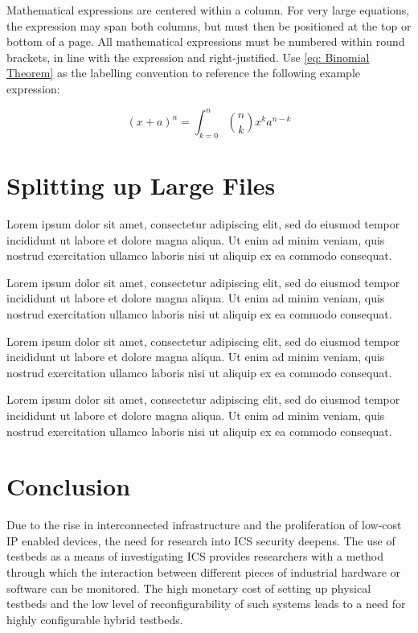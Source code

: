 \documentclass[10pt,conference,a4paper,onecolumn] {IEEEtran}
\begin{document}
\begin{multicols}{2}
Mathematical expressions are centered within a column. For very large equations, the expression may span both columns, but must then be positioned at the top or bottom of a page. All mathematical expressions must be numbered within round brackets, in line with the expression and right-justified. Use \eqref{eq: Binomial Theorem} as the labelling convention to reference the following example expression:

\begin{equation}\label{eq: Binomial Theorem}
(x+a)^n=\int_{k=0}^n\binom{n}{k}x^k a^{n-k}
\end{equation}

\section{Splitting up Large Files}

Lorem ipsum dolor sit amet, consectetur adipiscing elit, sed do eiusmod tempor incididunt ut labore et dolore magna aliqua. Ut enim ad minim veniam, quis nostrud exercitation ullamco laboris nisi ut aliquip ex ea commodo consequat. 

Lorem ipsum dolor sit amet, consectetur adipiscing elit, sed do eiusmod tempor incididunt ut labore et dolore magna aliqua. Ut enim ad minim veniam, quis nostrud exercitation ullamco laboris nisi ut aliquip ex ea commodo consequat.

Lorem ipsum dolor sit amet, consectetur adipiscing elit, sed do eiusmod tempor incididunt ut labore et dolore magna aliqua. Ut enim ad minim veniam, quis nostrud exercitation ullamco laboris nisi ut aliquip ex ea commodo consequat. 

Lorem ipsum dolor sit amet, consectetur adipiscing elit, sed do eiusmod tempor incididunt ut labore et dolore magna aliqua. Ut enim ad minim veniam, quis nostrud exercitation ullamco laboris nisi ut aliquip ex ea commodo consequat.   

\section{Conclusion}
%
Due to the rise in interconnected infrastructure and the proliferation of low-cost IP enabled devices, the need for research into ICS security deepens. The use of testbeds as a means of investigating ICS provides researchers with a method through which the interaction between different pieces of industrial hardware or software can be monitored. The high monetary cost of setting up physical testbeds and the low level of reconfigurability of such systems leads to a need for highly configurable hybrid testbeds.


\end{multicols}
\end{document}
